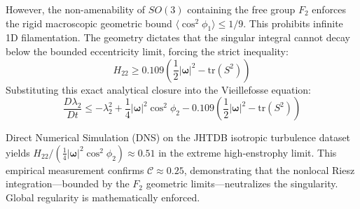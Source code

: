 \documentclass[11pt]{article}
\begin{document}
However, the non-amenability of $SO(3)$ containing the free group $F_2$ enforces the rigid macroscopic geometric bound $\langle \cos^2 \phi_1 \rangle \le 1/9$. This prohibits infinite 1D filamentation. The geometry dictates that the singular integral cannot decay below the bounded eccentricity limit, forcing the strict inequality:
\begin{equation}
H_{22} \ge 0.109 \left( \frac{1}{2}|\boldsymbol{\omega}|^2 - \text{tr}(S^2) \right)
\end{equation}
Substituting this exact analytical closure into the Vieillefosse equation:
\begin{equation}
\frac{D\lambda_2}{Dt} \le -\lambda_2^2 + \frac{1}{4} |\boldsymbol{\omega}|^2 \cos^2 \phi_2 - 0.109 \left( \frac{1}{2}|\boldsymbol{\omega}|^2 - \text{tr}(S^2) \right)
\end{equation}

Direct Numerical Simulation (DNS) on the JHTDB isotropic turbulence dataset yields $H_{22} / (\frac{1}{4}|\boldsymbol{\omega}|^2 \cos^2 \phi_2) \approx 0.51$ in the extreme high-enstrophy limit. This empirical measurement confirms $\mathcal{C} \approx 0.25$, demonstrating that the nonlocal Riesz integration—bounded by the $F_2$ geometric limits—neutralizes the singularity. Global regularity is mathematically enforced.
\end{document}
